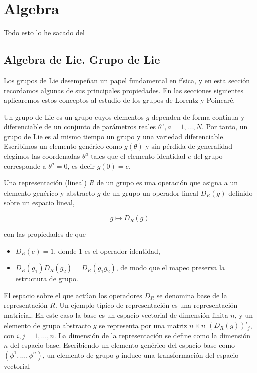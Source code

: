 \setchapterpreamble[u]{\margintoc}
\chapter{Algebra}

\begin{center}
  \large Todo esto lo he sacado del \cite{maggiore2005modern}
\end{center}
\section{Algebra de Lie. Grupo de Lie}
Los grupos de Lie desempeñan un papel fundamental en física, y en esta sección recordamos algunas de sus principales propiedades. En las secciones siguientes aplicaremos estos conceptos al estudio de los grupos de Lorentz y Poincaré.

Un grupo de Lie es un grupo cuyos elementos $g$ dependen de forma continua y diferenciable de un conjunto de parámetros reales $\theta^{a}, a=1, \ldots, N$. Por tanto, un grupo de Lie es al mismo tiempo un grupo y una variedad diferenciable. Escribimos un elemento genérico como $g(\theta)$ y sin pérdida de generalidad elegimos las coordenadas $\theta^{a}$ tales que el elemento identidad $e$ del grupo corresponde a $\theta^{a}=0$, es decir $g(0)=e$.

Una representación (lineal) $R$ de un grupo es una operación que asigna a un elemento genérico y abstracto $g$ de un grupo un operador lineal $D_{R}(g)$ definido sobre un espacio lineal, 

\begin{equation}
  g \mapsto D_{R}(g) 
  \end{equation}

  con las propiedades de que 
  
  \begin{itemize}
    \item $D_{R}(e)=1$, donde 1 es el operador identidad,
    \item $D_{R}\left(g_{1}\right) D_{R}\left(g_{2}\right)=D_{R}\left(g_{1} g_{2}\right)$, de modo que el mapeo preserva la estructura de grupo.
  \end{itemize}

  El espacio sobre el que actúan los operadores $D_{R}$ se denomina base de la representación $R$. Un ejemplo típico de representación es una representación matricial. En este caso la base es un espacio vectorial de dimensión finita $n$, y un elemento de grupo abstracto $g$ se representa por una matriz $n \times n$ $\left(D_{R}(g)\right)^{i}{ }_{j}$, con $i, j=1, \ldots, n$. La dimensión de la representación se define como la dimensión $n$ del espacio base. Escribiendo un elemento genérico del espacio base como $\left(\phi^{1}, \ldots, \phi^{n}\right)$, un elemento de grupo $g$ induce una transformación del espacio vectorial


